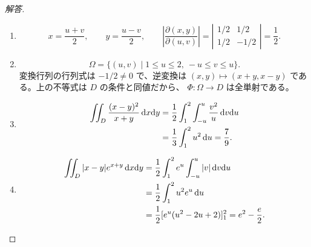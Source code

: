 \begin{proof}[解答]
\begin{enumerate}
  \item[(1)]
  \[
  x=\frac{u+v}{2},\qquad y=\frac{u-v}{2},\qquad
  \left|\frac{\partial(x,y)}{\partial(u,v)}\right|
  =\left|\begin{matrix}1/2&1/2\\1/2&-1/2\end{matrix}\right|=\frac12.
  \]

  \item[(2)]
  \[
  \Omega=\{(u,v)\mid1\le u\le2,\ -u\le v\le u\}.
  \]
  変換行列の行列式は $-1/2\ne0$ で、逆変換は
  $(x,y)\mapsto(x+y,x-y)$ である。上の不等式は $D$ の条件と同値だから、
  $\Phi:\Omega\to D$ は全単射である。

  \item[(3)]
  \begin{align*}
  \iint_D\frac{(x-y)^2}{x+y}\,\mathrm{d} x\mathrm{d} y
  &=\frac12\int_1^2\int_{-u}^u\frac{v^2}{u}\,\mathrm{d} v\mathrm{d} u\\
  &=\frac13\int_1^2u^2\,\mathrm{d} u=\frac79.
  \end{align*}

  \item[(4)]
  \begin{align*}
  \iint_D|x-y|e^{x+y}\,\mathrm{d} x\mathrm{d} y
  &=\frac12\int_1^2e^u\int_{-u}^u|v|\,\mathrm{d} v\mathrm{d} u\\
  &=\frac12\int_1^2u^2e^u\,\mathrm{d} u\\
  &=\frac12[e^u(u^2-2u+2)]_1^2
  =e^2-\frac e2.
  \end{align*}
\end{enumerate}
\end{proof}

